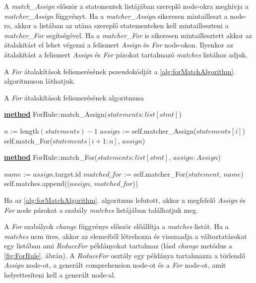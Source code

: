 A \emph{match\_Assign} először a statementek listájában szereplő
node-okra meghívja a \emph{matcher\_Assign} függvényt.
Ha a \emph{matcher\_Assign} sikeresen mintailleszt a node-ra,
akkor a listában az utána szereplő
statementeken kell mintailleszteni a \emph{matcher\_For} segítségével.
Ha a \emph{matcher\_For} is sikeresen mintaillesztett akkor az átalakítást
el lehet végezni
a felismert \emph{Assign} és \emph{For} node-okon.
Ilyenkor az átalakítást a felismert \emph{Assign} és \emph{For} párokat tartalmazó
\emph{matches} listához adjuk.

A \emph{For} átalakítások felismerésének pszeudokódját a
\ref{alg:forMatchAlgorithm}. algoritmuson láthatjuk.

\begin{algorithm}[H]
	\caption{A \emph{For} átalakítások felismerésének algoritmusa}
	\label{alg:forMatchAlgorithm}
	\textbf{\underline{method}} ForRule::match\_Assign($statements: list[stmt]$)
	
	\begin{algorithmic}[1]
	\State $n$ := length$(statements) - 1$
		\State $assign$ := self.matcher\_Assign($statements[i]$)
			\State self.match\_For($statements[i+1:n]$, $assign$)
		\EndIf
	\EndFor
	\end{algorithmic}

	\textbf{\underline{method}} ForRule::match\_For($statements: list[stmt]$, $assign: Assign$)
	\begin{algorithmic}[1]	
	\State $name$ := $assign$.target.id
		\State $matched\_for$ := self.matcher\_For($statement$, $name$)
			\State self.matches.append(($assign$, $matched\_for$))
			\State \Return
		\EndIf
			\State \Return
		\EndIf
	\EndFor
	\end{algorithmic}
\end{algorithm}

Ha az \ref{alg:forMatchAlgorithm}. algoritmus lefutott,
akkor a megfelelő \emph{Assign} és \emph{For} node
párokat a szabály \emph{matches} listájában találhatjuk meg.

A \emph{For} szabályok \emph{change} függvénye először előállítja a \emph{matches} listát.
Ha a \emph{matches} nem üres, akkor az elemeiből létrehozza és visszaadja
a változtatásokat egy listában ami \emph{ReduceFor} példányokat tartalmaz
(lásd \emph{change} metódus a \ref{fig:ForRule}. ábrán).
A \emph{ReduceFor} osztály egy példánya tartalmazza
a törlendő \emph{Assign} node-ot,
a generált comprehension node-ot és
a \emph{For} node-ot, amit helyettesíteni kell a generált node-al.

